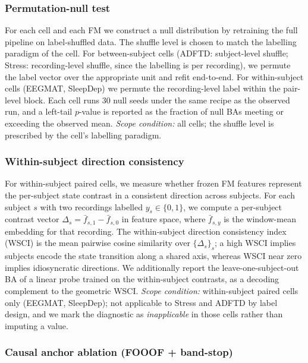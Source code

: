 \subsubsection{Permutation-null test}
\label{sec:methods_null}

For each cell and each FM we construct a null distribution by
retraining the full pipeline on label-shuffled data. The shuffle level
is chosen to match the labelling paradigm of the cell. For
between-subject cells (ADFTD: subject-level shuffle; Stress:
recording-level shuffle, since the labelling is per recording), we
permute the label vector over the appropriate unit and refit
end-to-end. For within-subject cells (EEGMAT, SleepDep) we permute the
recording-level label within the pair-level block. Each cell runs
30 null seeds under the same recipe as the observed run, and a
left-tail $p$-value is reported as the fraction of null BAs meeting or
exceeding the observed mean. \emph{Scope condition:} all cells; the
shuffle level is prescribed by the cell's labelling paradigm.

\subsubsection{Within-subject direction consistency}
\label{sec:methods_wsci}

For within-subject paired cells, we measure whether frozen FM features
represent the per-subject state contrast in a consistent direction
across subjects. For each subject $s$ with two recordings labelled
$y_s \in \{0,1\}$, we compute a per-subject contrast vector
$\Delta_s = \bar f_{s,1} - \bar f_{s,0}$ in feature space, where
$\bar f_{s,y}$ is the window-mean embedding for that recording. The
within-subject direction consistency index (WSCI) is the mean pairwise
cosine similarity over $\{\Delta_s\}_s$; a high WSCI implies subjects
encode the state transition along a shared axis, whereas WSCI near
zero implies idiosyncratic directions. We additionally report the
leave-one-subject-out BA of a linear probe trained on the within-subject
contrasts, as a decoding complement to the geometric WSCI.
\emph{Scope condition:} within-subject paired cells only (EEGMAT,
SleepDep); not applicable to Stress and ADFTD by label design, and we
mark the diagnostic as \emph{inapplicable} in those cells rather than
imputing a value.

\subsubsection{Causal anchor ablation (FOOOF + band-stop)}
\label{sec:methods_anchor}

